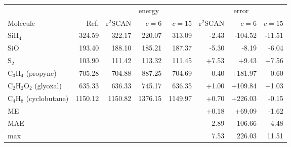 \begin{tabular}{@{}l rrrr rrr@{}}
\toprule
 &  & \multicolumn{3}{c}{energy} & \multicolumn{3}{c}{error} \\
\cmidrule(lr){3-5}\cmidrule(lr){6-8}
Molecule & Ref. & r$^2$SCAN & $c=6$ & $c=15$ & r$^2$SCAN & $c=6$ & $c=15$ \\
\midrule
SiH$_4$ & 324.59 & \textcolor{pyscfred}{322.17} & \textcolor{pyscfred}{220.07} & \textcolor{pyscfred}{313.09} & \textcolor{pyscfred}{-2.43} & \textcolor{pyscfred}{-104.52} & \textcolor{pyscfred}{-11.51} \\
SiO & 193.40 & \textcolor{pyscfred}{188.10} & \textcolor{pyscfred}{185.21} & \textcolor{pyscfred}{187.37} & \textcolor{pyscfred}{-5.30} & \textcolor{pyscfred}{-8.19} & \textcolor{pyscfred}{-6.04} \\
S$_2$ & 103.90 & \textcolor{pyscfred}{111.42} & \textcolor{pyscfred}{113.32} & \textcolor{pyscfred}{111.45} & \textcolor{pyscfred}{+7.53} & \textcolor{pyscfred}{+9.43} & \textcolor{pyscfred}{+7.56} \\
C$_3$H$_4$ (propyne) & 705.28 & \textcolor{pyscfred}{704.88} & \textcolor{pyscfred}{887.25} & \textcolor{pyscfred}{704.69} & \textcolor{pyscfred}{-0.40} & \textcolor{pyscfred}{+181.97} & \textcolor{pyscfred}{-0.60} \\
C$_2$H$_2$O$_2$ (glyoxal) & 635.33 & \textcolor{pyscfred}{636.33} & \textcolor{pyscfred}{745.17} & \textcolor{pyscfred}{636.35} & \textcolor{pyscfred}{+1.00} & \textcolor{pyscfred}{+109.84} & \textcolor{pyscfred}{+1.03} \\
C$_4$H$_8$ (cyclobutane) & 1150.12 & \textcolor{pyscfred}{1150.82} & \textcolor{pyscfred}{1376.15} & \textcolor{pyscfred}{1149.97} & \textcolor{pyscfred}{+0.70} & \textcolor{pyscfred}{+226.03} & \textcolor{pyscfred}{-0.15} \\
\midrule
ME &  &  &  &  & \textcolor{pyscfred}{+0.18} & \textcolor{pyscfred}{+69.09} & \textcolor{pyscfred}{-1.62} \\
MAE &  &  &  &  & \textcolor{pyscfred}{2.89} & \textcolor{pyscfred}{106.66} & \textcolor{pyscfred}{4.48} \\
max &  &  &  &  & \textcolor{pyscfred}{7.53} & \textcolor{pyscfred}{226.03} & \textcolor{pyscfred}{11.51} \\
\bottomrule
\end{tabular}
